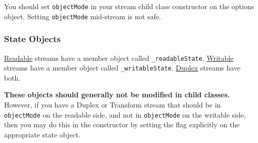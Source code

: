 You should set \texttt{objectMode} in your stream child class
constructor on the options object. Setting \texttt{objectMode}
mid-stream is not safe.

\subsubsection{State Objects}

\hyperref[stream\_class\_stream\_readable]{Readable} streams have a
member object called \texttt{\_readableState}.
\hyperref[stream\_class\_stream\_writable]{Writable} streams have a
member object called \texttt{\_writableState}.
\hyperref[stream\_class\_stream\_duplex]{Duplex} streams have both.

\textbf{These objects should generally not be modified in child
classes.} However, if you have a Duplex or Transform stream that should
be in \texttt{objectMode} on the readable side, and not in
\texttt{objectMode} on the writable side, then you may do this in the
constructor by setting the flag explicitly on the appropriate state
object.

